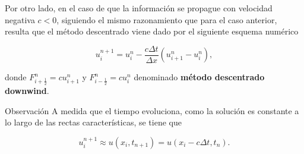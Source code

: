 \begin{frame}
    \frametitle{\subsecname}

    Por otro lado, en el caso de que la información se propague con
    velocidad negativa $c<0$, %
    siguiendo el mismo razonamiento que para el caso anterior, resulta
    que el método descentrado viene dado por el siguiente esquema
    numérico

    \begin{equation}\label{eq:downwind}
        u^{n+1}_{i}=
        u^{n}_{i}-
        \frac{c\Delta t}{\Delta x}
        \left(
        u^{n}_{i+1}-
        u^{n}_{i}
        \right),
    \end{equation}

    donde
    \begin{math}
        F^{n}_{i+\frac{1}{2}}=
        cu^{n}_{i+1}
    \end{math}
    y
    \begin{math}
        F^{n}_{i-\frac{1}{2}}=
        cu^{n}_{i}
    \end{math}
    denominado \textbf{método descentrado downwind}.

    \begin{alertblock}{Observación}
        A medida que el tiempo evoluciona, como la solución es constante a lo
        largo de las rectas características, se tiene que

        \begin{equation*}
            u^{n+1}_{i}\approx
            u
            \left(x_{i},t_{n+1}\right)=
            u
            \left(
            x_{i}-
            c\Delta t,t_{n}
            \right).
        \end{equation*}
    \end{alertblock}
\end{frame}
